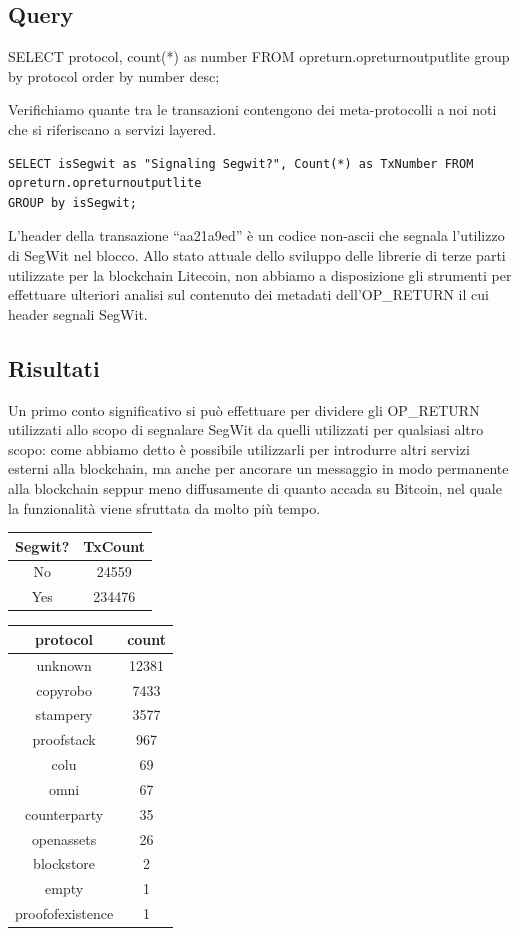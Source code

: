 \subsection{Query}

SELECT protocol, count(*) as number FROM opreturn.opreturnoutputlite
group by protocol order by number desc;

Verifichiamo quante tra le transazioni contengono dei meta-protocolli a noi noti che si riferiscano a servizi layered.

\begin{lstlisting}
SELECT isSegwit as "Signaling Segwit?", Count(*) as TxNumber FROM opreturn.opreturnoutputlite
GROUP by isSegwit;
\end{lstlisting}

L’header della transazione “aa21a9ed” è un codice non-ascii che segnala l’utilizzo di SegWit nel blocco. Allo stato attuale dello sviluppo delle librerie di terze parti utilizzate per la blockchain Litecoin, non abbiamo a disposizione gli strumenti per effettuare ulteriori analisi sul contenuto dei metadati dell’OP\_RETURN il cui header segnali SegWit.
\subsection{Risultati}

Un primo conto significativo si può effettuare per dividere gli OP\_RETURN utilizzati allo scopo di segnalare SegWit da quelli utilizzati per qualsiasi altro scopo: come abbiamo detto è possibile utilizzarli per introdurre altri servizi esterni alla blockchain, ma anche per ancorare un messaggio in modo permanente alla blockchain seppur meno diffusamente di quanto accada su Bitcoin, nel quale la funzionalità viene sfruttata da molto più tempo.

\begin{tabular}{|c|c|}
	\hline 
	\textbf{Segwit?} & \textbf{TxCount} \\ 
	\hline 
	No & 24559 \\ 
	\hline 
	Yes & 234476 \\ 
	\hline 
\end{tabular} 

\begin{tabular}{|c|c|}
	\hline 
	\textbf{protocol}& \textbf{count}  \\ 
	\hline 
unknown	&  12381\\ 
	\hline 
copyrobo	&  7433\\ 
	\hline 
stampery	& 3577 \\ 
	\hline 
proofstack	& 967 \\ 
	\hline 
colu	& 69 \\ 
	\hline 
omni	& 67 \\ 
	\hline 
counterparty	& 35 \\ 
	\hline 
openassets	& 26 \\ 
	\hline 
blockstore	& 2 \\ 
	\hline 
empty	& 1 \\ 
	\hline 
proofofexistence	& 1 \\ 
	\hline 
\end{tabular} 

